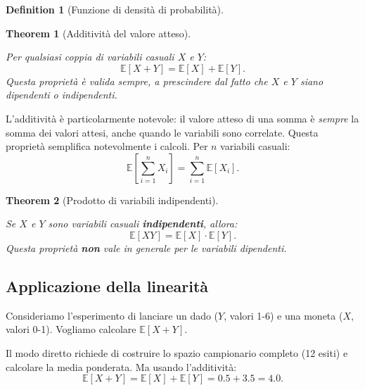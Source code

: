 \documentclass[
  letterpaper,
  DIV=11,
  numbers=noendperiod,
  oneside]{scrreprt}
\theoremstyle{definition}
\theoremstyle{plain}
\newtheorem{theorem}{Theorem}[chapter]
\theoremstyle{definition}
\newtheorem{definition}{Definition}[chapter]
\theoremstyle{remark}
\begin{document}
\begin{definition}[Funzione di densità di
probabilità]
\begin{theorem}[Additività del valore
atteso]\protect\hypertarget{thm-expected-value-additivity}{}\label{thm-expected-value-additivity}

Per qualsiasi coppia di variabili casuali \(X\) e \(Y\): \[
\mathbb{E}[X + Y] = \mathbb{E}[X] + \mathbb{E}[Y].
\] Questa proprietà è valida sempre, a prescindere dal fatto che \(X\) e
\(Y\) siano dipendenti o indipendenti.

\end{theorem}

L'additività è particolarmente notevole: il valore atteso di una somma è
\emph{sempre} la somma dei valori attesi, anche quando le variabili sono
correlate. Questa proprietà semplifica notevolmente i calcoli. Per \(n\)
variabili casuali: \[
\mathbb{E}\left[\sum_{i=1}^{n} X_i\right] = \sum_{i=1}^{n} \mathbb{E}[X_i].
\]

\begin{theorem}[Prodotto di variabili
indipendenti]\protect\hypertarget{thm-expected-value-product}{}\label{thm-expected-value-product}

Se \(X\) e \(Y\) sono variabili casuali \textbf{indipendenti}, allora:
\[
\mathbb{E}[XY] = \mathbb{E}[X] \cdot \mathbb{E}[Y].
\] Questa proprietà \textbf{non} vale in generale per le variabili
dipendenti.

\end{theorem}

\begin{tcolorbox}[enhanced jigsaw, arc=.35mm, breakable, colbacktitle=quarto-callout-note-color!10!white, opacityback=0, toprule=.15mm, rightrule=.15mm, colback=white, opacitybacktitle=0.6, leftrule=.75mm, coltitle=black, bottomtitle=1mm, left=2mm, toptitle=1mm, title=\textcolor{quarto-callout-note-color}{\faInfo}\hspace{0.5em}{Esempio: Dado e moneta}, titlerule=0mm, bottomrule=.15mm, colframe=quarto-callout-note-color-frame]

\subsection{Applicazione della
linearità}\label{applicazione-della-linearituxe0}

Consideriamo l'esperimento di lanciare un dado (\(Y\), valori 1-6) e una
moneta (\(X\), valori 0-1). Vogliamo calcolare \(\mathbb{E}[X + Y]\).

Il modo diretto richiede di costruire lo spazio campionario completo (12
esiti) e calcolare la media ponderata. Ma usando l'additività: \[
\mathbb{E}[X + Y] = \mathbb{E}[X] + \mathbb{E}[Y] = 0.5 + 3.5 = 4.0.
\]


\end{tcolorbox}
\end{definition}
\end{document}
